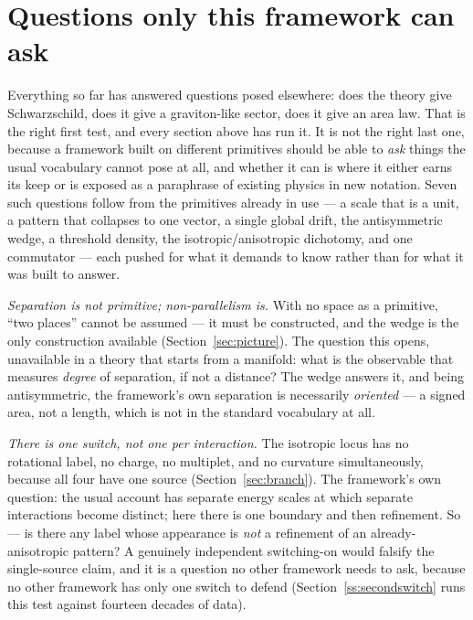 \documentclass[pdflatex,sn-mathphys-num]{sn-jnl}
\theoremstyle{thmstyleone}
\theoremstyle{thmstylethree}
\theoremstyle{thmstyletwo}
\begin{document}
\section{Questions only this framework can ask}\label{ss:native}

Everything so far has answered questions posed elsewhere: does the
theory give Schwarzschild, does it give a graviton-like sector, does it
give an area law. That is the right first test, and every section above
has run it. It is not the right last one, because a framework built on
different primitives should be able to \emph{ask} things the usual
vocabulary cannot pose at all, and whether it can is where it either
earns its keep or is exposed as a paraphrase of existing physics in new
notation. Seven such questions follow from the primitives already in
use — a scale that is a unit, a pattern that collapses to one vector, a
single global drift, the antisymmetric wedge, a threshold density, the
isotropic/anisotropic dichotomy, and one commutator — each pushed for
what it demands to know rather than for what it was built to answer.

\emph{Separation is not primitive; non-parallelism is.} With no space as
a primitive, ``two places'' cannot be assumed — it must be constructed,
and the wedge is the only construction available (Section~\ref{sec:picture}).
The question this opens, unavailable in a theory that starts from a
manifold: what is the observable that measures \emph{degree} of
separation, if not a distance? The wedge answers it, and being
antisymmetric, the framework's own separation is necessarily
\emph{oriented} — a signed area, not a length, which is not in the
standard vocabulary at all.

\emph{There is one switch, not one per interaction.} The isotropic locus
has no rotational label, no charge, no multiplet, and no curvature
simultaneously, because all four have one source (Section~\ref{sec:branch}).
The framework's own question: the usual account has separate energy
scales at which separate interactions become distinct; here there is one
boundary and then refinement. So — is there any label whose appearance
is \emph{not} a refinement of an already-anisotropic pattern? A
genuinely independent switching-on would falsify the single-source claim,
and it is a question no other framework needs to ask, because no other
framework has only one switch to defend (Section~\ref{ss:secondswitch}
runs this test against fourteen decades of data).
\end{document}
